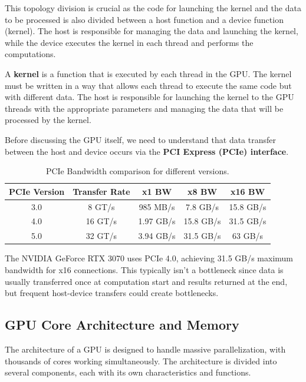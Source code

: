 This topology division is crucial as the code for launching the kernel and the data to be processed is also divided between a host function and a device function (kernel). The host is responsible for managing the data and launching the kernel, while the device executes the kernel in each thread and performs the computations.

A \textbf{kernel} \cite{GPUkerneloptimization,juliagpu} is a function that is executed by each thread in the GPU. The kernel must be written in a way that allows each thread to execute the same code but with different data. The host is responsible for launching the kernel to the GPU threads with the appropriate parameters and managing the data that will be processed by the kernel.

Before discussing the GPU itself, we need to understand that data transfer between the host and device occurs via the \textbf{PCI Express (PCIe) interface}.

\begin{table}[h]
    \centering
    \label{tab:pcie_bandwidth}
    \begin{tabular}{|c|c|c|c|c|}
        \hline
        \textbf{PCIe Version} & \textbf{Transfer Rate} & \textbf{x1 BW} & \textbf{x8 BW} & \textbf{x16 BW} \\
        \hline
        3.0 & 8 GT/s & 985 MB/s & 7.8 GB/s & 15.8 GB/s \\
        \hline
        4.0 & 16 GT/s & 1.97 GB/s & 15.8 GB/s & 31.5 GB/s \\
        \hline
        5.0 & 32 GT/s & 3.94 GB/s & 31.5 GB/s & 63 GB/s \\
        \hline
    \end{tabular}
    \caption{PCIe Bandwidth comparison for different versions.}
\end{table}

The NVIDIA GeForce RTX 3070 \cite{RTX3070specs} uses PCIe 4.0, achieving 31.5 GB/s maximum bandwidth for x16 connections. This typically isn't a bottleneck since data is usually transferred once at computation start and results returned at the end, but frequent host-device transfers could create bottlenecks.

\clearpage

\subsection{GPU Core Architecture and Memory}

The architecture of a GPU is designed to handle massive parallelization, with thousands of cores working simultaneously. The architecture is divided into several components, each with its own characteristics and functions.

